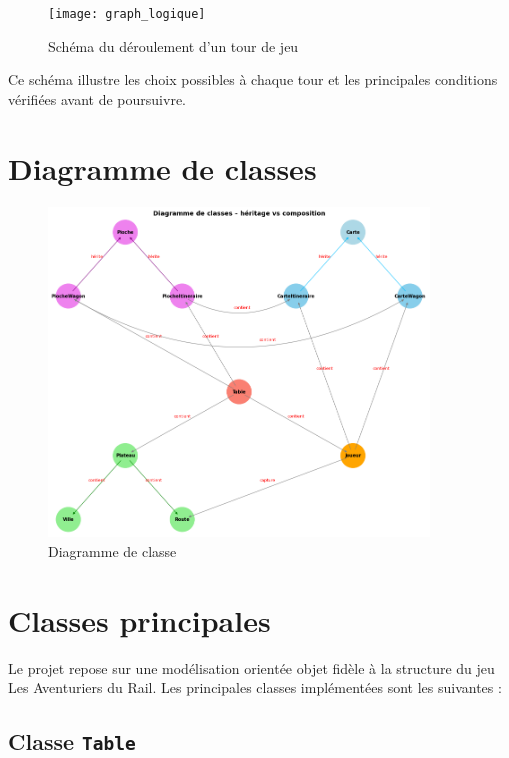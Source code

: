 \documentclass[a4paper,12pt]{report}
\begin{document}
\begin{figure}[H]
    \centering
    \texttt{[image: graph\_logique]}
    \caption{Schéma du déroulement d’un tour de jeu}
    \label{fig:tour_de_jeu}
\end{figure}

\noindent Ce schéma illustre les choix possibles à chaque tour et les principales conditions vérifiées avant de poursuivre.



\section{Diagramme de classes}

\begin{figure}[H]
    \centering
    \includegraphics[width=0.9\textwidth]{diagramme_classe}
    \caption{Diagramme de classe}
    \label{fig:diagramme_classe}
\end{figure}


\section{Classes principales}

Le projet repose sur une modélisation orientée objet fidèle à la structure du jeu Les Aventuriers du Rail.
Les principales classes implémentées sont les suivantes :

\subsection*{Classe \texttt{Table}}
\end{document}
